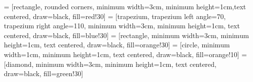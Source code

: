 
 = [rectangle, rounded corners, minimum width=3cm, minimum height=1cm,text centered, draw=black, fill=red!30]
 = [trapezium, trapezium left angle=70, trapezium right angle=110, minimum width=3cm, minimum height=1cm, text centered, draw=black, fill=blue!30]
 = [rectangle, minimum width=3cm, minimum height=1cm, text centered, draw=black, fill=orange!30]
 = [circle, minimum width=1cm, minimum height=1cm, text
centered, draw=black, fill=orange!10]
 = [diamond, minimum width=3cm, minimum height=1cm, text centered, draw=black, fill=green!30]

\usetikzlibrary{shapes.geometric, arrows}
